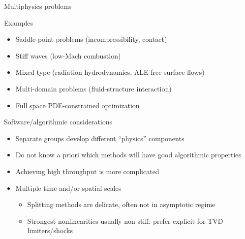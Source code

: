 \begin{frame}{Multiphysics problems}
  \begin{block}{Examples}
    \begin{itemize}
    \item Saddle-point problems (\eg incompressibility, contact)
    \item Stiff waves (\eg low-Mach combustion)
    \item Mixed type (\eg radiation hydrodynamics, ALE free-surface flows)
    \item Multi-domain problems (\eg fluid-structure interaction)
    \item Full space PDE-constrained optimization
    \end{itemize}
  \end{block}
  \vspace{-0.5em}
  \begin{block}{Software/algorithmic considerations}
    \begin{itemize}
    \item Separate groups develop different ``physics'' components
    \item Do not know a priori which methods will have good algorithmic properties
    \item Achieving high throughput is more complicated
    \item Multiple time and/or spatial scales
      \begin{itemize}
      \item Splitting methods are delicate, often not in asymptotic regime
      \item Strongest nonlinearities usually non-stiff: prefer explicit for TVD limiters/shocks
      \end{itemize}
    \end{itemize}
  \end{block}
\end{frame}
